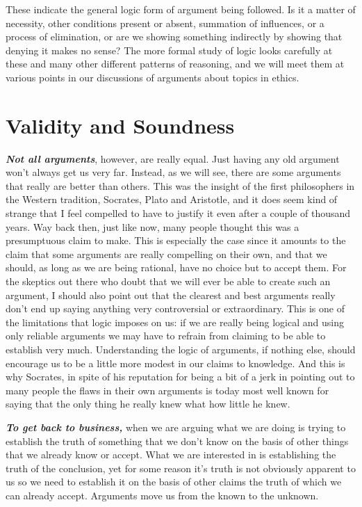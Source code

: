 \documentclass[12pt, openany]{book}
\begin{document}
These indicate the general logic form of argument being followed. Is it a matter of necessity, other conditions present or absent, summation of influences, or a process of elimination, or are we showing something indirectly by showing that denying it makes no sense? The more formal study of logic looks carefully at these and many other different patterns of reasoning, and we will meet them at various points in our discussions of arguments about topics in ethics.

\hypertarget{validity-and-soundness}{%
\section{Validity and Soundness}\label{validity-and-soundness}}

\textbf{\emph{Not all arguments}}, however, are really equal. Just having any old argument won't always get us very far. Instead, as we will see, there are some arguments that really are better than others. This was the insight of the first philosophers in the Western tradition, Socrates, Plato and Aristotle, and it does seem kind of strange that I feel compelled to have to justify it even after a couple of thousand years. Way back then, just like now, many people thought this was a presumptuous claim to make. This is especially the case since it amounts to the claim that some arguments are really compelling on their own, and that we should, as long as we are being rational, have no choice but to accept them. For the skeptics out there who doubt that we will ever be able to create such an argument, I should also point out that the clearest and best arguments really don't end up saying anything very controversial or extraordinary. This is one of the limitations that logic imposes on us: if we are really being logical and using only reliable arguments we may have to refrain from claiming to be able to establish very much. Understanding the logic of arguments, if nothing else, should encourage us to be a little more modest in our claims to knowledge. And this is why Socrates, in spite of his reputation for being a bit of a jerk in pointing out to many people the flaws in their own arguments is today most well known for saying that the only thing he really knew what how little he knew.

\textbf{\emph{To get back to business,}} when we are arguing what we are doing is trying to establish the truth of something that we don't know on the basis of other things that we already know or accept. What we are interested in is establishing the truth of the conclusion, yet for some reason it's truth is not obviously apparent to us so we need to establish it on the basis of other claims the truth of which we can already accept. Arguments move us from the known to the unknown.
\end{document}
